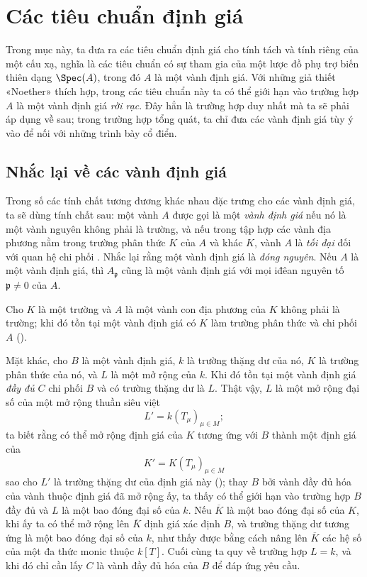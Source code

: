 \documentclass[oneside,10pt]{amsart}
\newcommand{\oldpage}[2][]{\marginnote{\normalfont\footnotesize\textbf{#1}~|~#2}\ignorespaces}
\let\EGAOriginalLabel\label
\renewcommand{\label}[1]{\phantomsection\EGAOriginalLabel{#1}}
\begin{document}
\section{Các tiêu chuẩn định giá}
\label{section:II.7}

Trong mục này, ta đưa ra các tiêu chuẩn định giá cho tính tách và tính riêng của một cấu xạ, nghĩa là các tiêu chuẩn có sự tham gia của một lược đồ phụ trợ biến thiên dạng $\Spec(A)$, trong đó $A$ là một vành định giá.
Với những giả thiết «Noether» thích hợp, trong các tiêu chuẩn này ta có thể giới hạn vào trường hợp $A$ là một vành định giá \emph{rời rạc}.
Đây hẳn là trường hợp duy nhất mà ta sẽ phải áp dụng về sau; trong trường hợp tổng quát, ta chỉ đưa các vành định giá tùy ý vào để nối với những trình bày cổ điển.

\subsection{Nhắc lại về các vành định giá}
\label{subsection:II.7.1}

\begin{env}[7.1.1]
\label{II.7.1.1}
Trong số các tính chất tương đương khác nhau đặc trưng cho các vành định giá, ta sẽ dùng tính chất sau:
một vành $A$ được gọi là một \emph{vành định giá} nếu nó là một vành nguyên không phải là trường, và nếu trong tập hợp các vành địa phương nằm trong trường phân thức $K$ của $A$ và khác $K$, vành $A$ là \emph{tối đại} đối với quan hệ chi phối .
Nhắc lại rằng một vành định giá là \emph{đóng nguyên}.
Nếu $A$ là một vành định giá, thì $A_\mathfrak{p}$ cũng là một vành định giá với mọi iđêan nguyên tố $\mathfrak{p}\neq0$ của $A$.
\end{env}

\begin{env}[7.1.2]
\label{II.7.1.2}
Cho $K$ là một trường và $A$ là một vành con địa phương của $K$ không phải là trường;
\oldpage[II]{139}
khi đó tồn tại một vành định giá có $K$ làm trường phân thức và chi phối $A$ (\cite[p.~1-07, Bổ đề~2]{I-1}).

Mặt khác, cho $B$ là một vành định giá, $k$ là trường thặng dư của nó, $K$ là trường phân thức của nó, và $L$ là một mở rộng của $k$.
Khi đó tồn tại một vành định giá \emph{đầy đủ} $C$ chi phối $B$ và có trường thặng dư là $L$.
Thật vậy, $L$ là một mở rộng đại số của một mở rộng thuần siêu việt
\[
  L'=k(T_\mu)_{\mu\in M};
\]
ta biết rằng có thể mở rộng định giá của $K$ tương ứng với $B$ thành một định giá của
\[
  K'=K(T_\mu)_{\mu\in M}
\]
sao cho $L'$ là trường thặng dư của định giá này (\cite[p.~98]{II-24});
thay $B$ bởi vành đầy đủ hóa của vành thuộc định giá đã mở rộng ấy, ta thấy có thể giới hạn vào trường hợp $B$ đầy đủ và $L$ là một bao đóng đại số của $k$.
Nếu $\overline{K}$ là một bao đóng đại số của $K$, khi ấy ta có thể mở rộng lên $\overline{K}$ định giá xác định $B$, và trường thặng dư tương ứng là một bao đóng đại số của $k$, như thấy được bằng cách nâng lên $\overline{K}$ các hệ số của một đa thức monic thuộc $k[T]$.
Cuối cùng ta quy về trường hợp $L=k$, và khi đó chỉ cần lấy $C$ là vành đầy đủ hóa của $B$ để đáp ứng yêu cầu.
\end{env}
\end{document}
